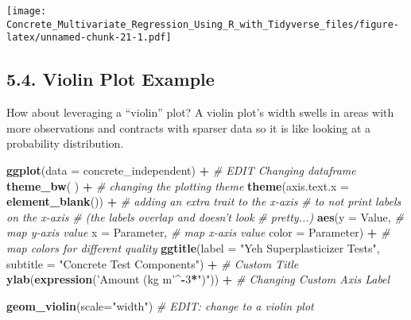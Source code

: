 \documentclass[]{article}
\newenvironment{Shaded}{\begin{snugshade}}{\end{snugshade}}
\newcommand{\CommentTok}[1]{\textcolor[rgb]{0.56,0.35,0.01}{\textit{#1}}}
\newcommand{\DataTypeTok}[1]{\textcolor[rgb]{0.13,0.29,0.53}{#1}}
\newcommand{\DecValTok}[1]{\textcolor[rgb]{0.00,0.00,0.81}{#1}}
\newcommand{\KeywordTok}[1]{\textcolor[rgb]{0.13,0.29,0.53}{\textbf{#1}}}
\newcommand{\NormalTok}[1]{#1}
\newcommand{\OperatorTok}[1]{\textcolor[rgb]{0.81,0.36,0.00}{\textbf{#1}}}
\newcommand{\StringTok}[1]{\textcolor[rgb]{0.31,0.60,0.02}{#1}}
\begin{document}
\texttt{[image: Concrete\_Multivariate\_Regression\_Using\_R\_with\_Tidyverse\_files/figure-latex/unnamed-chunk-21-1.pdf]}

\hypertarget{violin-plot-example}{%
\subsection{5.4. Violin Plot Example}\label{violin-plot-example}}

How about leveraging a ``violin'' plot? A violin plot's width swells in
areas with more observations and contracts with sparser data so it is
like looking at a probability distribution.

\begin{Shaded}
\begin{Highlighting}[]
\KeywordTok{ggplot}\NormalTok{(}\DataTypeTok{data =}\NormalTok{ concrete_independent) }\OperatorTok{+}\StringTok{      }\CommentTok{# EDIT Changing dataframe}
\StringTok{  }
\StringTok{  }\KeywordTok{theme_bw}\NormalTok{( ) }\OperatorTok{+}\StringTok{                            }\CommentTok{# changing the plotting theme}
\StringTok{  }
\StringTok{  }\KeywordTok{theme}\NormalTok{(}\DataTypeTok{axis.text.x =} \KeywordTok{element_blank}\NormalTok{()) }\OperatorTok{+}\StringTok{   }\CommentTok{# adding an extra trait to the x-axis}
\StringTok{                                           }\CommentTok{# to not print labels on the x-axis }
\StringTok{                                           }\CommentTok{# (the labels overlap and doesn't look}
\StringTok{                                           }\CommentTok{# pretty...)}
\StringTok{  }
\StringTok{  }\KeywordTok{aes}\NormalTok{(}\DataTypeTok{y      =}\NormalTok{ Value,                     }\CommentTok{# map y-axis value}
      \DataTypeTok{x      =}\NormalTok{ Parameter,                 }\CommentTok{# map x-axis value}
      \DataTypeTok{color  =}\NormalTok{ Parameter) }\OperatorTok{+}\StringTok{               }\CommentTok{# map colors for different quality}
\StringTok{  }
\StringTok{  }\KeywordTok{ggtitle}\NormalTok{(}\DataTypeTok{label    =} \StringTok{"Yeh Superplasticizer Tests"}\NormalTok{,}
          \DataTypeTok{subtitle =} \StringTok{"Concrete Test Components"}\NormalTok{) }\OperatorTok{+}\StringTok{ }\CommentTok{# Custom Title}
\StringTok{  }
\StringTok{  }\KeywordTok{ylab}\NormalTok{(}\KeywordTok{expression}\NormalTok{(}\StringTok{'Amount (kg m'}\OperatorTok{^-}\DecValTok{3}\OperatorTok{*}\StringTok{")"}\NormalTok{)) }\OperatorTok{+}\StringTok{ }\CommentTok{#  Changing Custom Axis Label}

\StringTok{  }\KeywordTok{geom_violin}\NormalTok{(}\DataTypeTok{scale=}\StringTok{"width"}\NormalTok{) }\CommentTok{# EDIT: change to a violin plot }
\end{Highlighting}
\end{Shaded}
\end{document}
